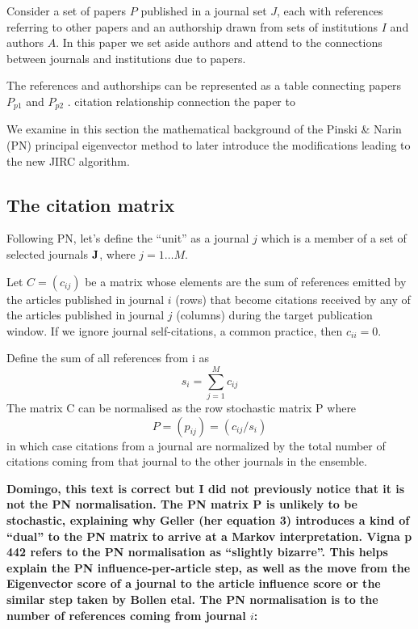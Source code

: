 \documentclass[10pt]{article}
\begin{document}
Consider a set of papers $P$ published in a journal set $J$, each with references referring to other papers and an authorship drawn from sets of institutions $I$ and authors $A$. In this paper we set aside authors and attend to the connections between journals and institutions due to papers. 


The references and authorships can be represented as a table connecting papers $P_{p1}$ and $P_{p2}$ . citation relationship connection the paper to 

We examine in this section the mathematical background of the Pinski \& Narin (PN) principal eigenvector method to later introduce the modifications leading to the new JIRC algorithm.
\subsection{The citation matrix}
Following PN, let's define the ``unit'' as a journal $j$ which is a member of a set of selected
journals $\bf{J}$, where $j = 1 \ldots M$.

Let $C = (c_{ij})$ be a matrix whose elements are the sum of references emitted by
the articles published in journal $i$ (rows) that become citations received by any of the articles published in journal $j$ (columns) during the target
publication window. If we ignore journal self-citations, a common practice, then $c_{ii} = 0$.


\noindent Define the sum of all references from i as
\begin{equation}
s_i = \sum_{j=1}^Mc_{ij}
\end{equation}
The matrix C can be normalised as the row stochastic matrix P where
\begin{equation}
P = (p_{ij}) = (c_{ij}/s_i)
\end{equation}
in which case citations from a journal are normalized by the total number of citations coming from that journal to the other journals in the ensemble.

\textbf{Domingo, this text is correct but I did not previously notice that it is not the PN normalisation. The PN matrix P is unlikely to be stochastic, explaining why Geller (her equation 3) introduces a kind of ``dual'' to the PN matrix to arrive at a Markov interpretation. Vigna p 442 refers to the PN normalisation as ``slightly bizarre''. This helps explain the PN influence-per-article step, as well as the move from the Eigenvector score of a journal to the article influence score or the similar step taken by Bollen etal.  The PN normalisation is to the number of references coming from journal $i$:}
\end{document}
